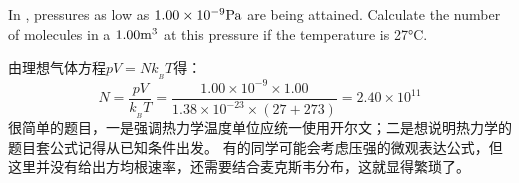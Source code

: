     \chapter[热力学]{}
    \begin{solution}[ Pressure]
    	In  , pressures as low as $1.00\times10^{-9}\rm{Pa}$ are being attained. 
    	Calculate the number of molecules in a $1.00\rm{m^{3}}$  at this pressure if the temperature is 27°C.
    	
    	\tcbrule
    	
        由理想气体方程$pV=Nk_{_B}T$得：
        \begin{equation*}
            N = \frac{pV}{k_{_B}T} = \frac{1.00\times10^{-9}\times 1.00}{1.38\times 10^{-23}\times (27+273)} = 2.40 \times 10^{11}
        \end{equation*}
        很简单的题目，一是强调热力学温度单位应统一使用开尔文；二是想说明热力学的题目套公式记得从已知条件出发。
        有的同学可能会考虑压强的微观表达公式，但这里并没有给出方均根速率，还需要结合麦克斯韦分布，这就显得繁琐了。
    \end{solution}
